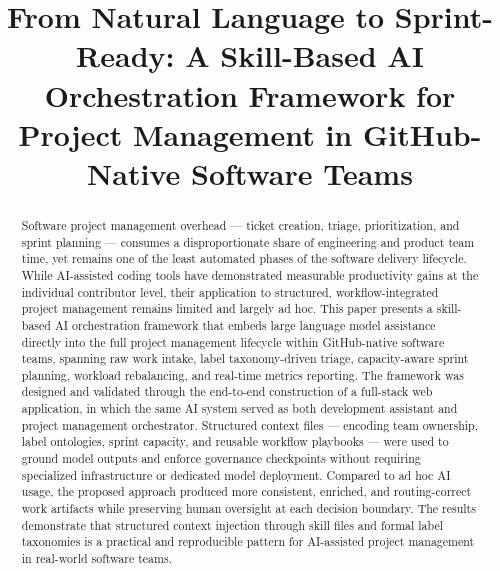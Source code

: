 \documentclass[conference]{IEEEtran}
\begin{document}
\title{From Natural Language to Sprint-Ready: A Skill-Based AI Orchestration
Framework for Project Management in GitHub-Native Software Teams}

\author{%
}

\maketitle

\begin{abstract}
Software project management overhead --- ticket creation, triage,
prioritization, and sprint planning --- consumes a disproportionate
share of engineering and product team time, yet remains one of the
least automated phases of the software delivery lifecycle. While
AI-assisted coding tools have demonstrated measurable productivity
gains at the individual contributor level, their application to
structured, workflow-integrated project management remains limited
and largely ad hoc. This paper presents a skill-based AI
orchestration framework that embeds large language model assistance
directly into the full project management lifecycle within
GitHub-native software teams, spanning raw work intake, label
taxonomy-driven triage, capacity-aware sprint planning, workload
rebalancing, and real-time metrics reporting. The framework was
designed and validated through the end-to-end construction of a
full-stack web application, in which the same AI system served as
both development assistant and project management orchestrator.
Structured context files --- encoding team ownership, label ontologies,
sprint capacity, and reusable workflow playbooks --- were used to
ground model outputs and enforce governance checkpoints without
requiring specialized infrastructure or dedicated model deployment.
Compared to ad hoc AI usage, the proposed approach produced more
consistent, enriched, and routing-correct work artifacts while
preserving human oversight at each decision boundary. The results
demonstrate that structured context injection through skill files and
formal label taxonomies is a practical and reproducible pattern for
AI-assisted project management in real-world software teams.
\end{abstract}
\end{document}
